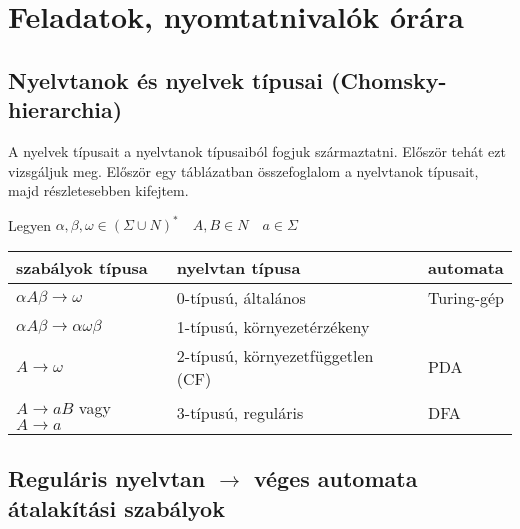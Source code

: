 \documentclass[a4paper]{article}
\begin{document}
\newpage
\section{Feladatok, nyomtatnivalók órára}
\label{sec:oraifeladat}



\subsection{Nyelvtanok és nyelvek típusai (Chomsky-hierarchia)}

A nyelvek típusait a nyelvtanok típusaiból fogjuk származtatni. Először
tehát ezt vizsgáljuk meg.  Először egy táblázatban összefoglalom a
nyelvtanok típusait, majd részletesebben kifejtem.

Legyen $\alpha, \beta, \omega \in (\Sigma \cup N)^* \quad A, B \in N
\quad a \in \Sigma$

\begin{tabular}{|lll|}
\hline
szabályok típusa & nyelvtan típusa&automata\\
\hline
$\alpha A \beta \to \omega$ & 0-típusú, általános&Turing-gép\\
$\alpha A \beta \to \alpha\omega\beta$ & 1-típusú, környezetérzékeny&\\
$A \to \omega$ & 2-típusú, környezetfüggetlen (CF)&PDA\\
$A \to aB$ vagy $A \to a$ & 3-típusú, reguláris&DFA\\
\hline
\end{tabular}


\subsection{Reguláris nyelvtan $\rightarrow$ véges automata átalakítási
szabályok}
\end{document}
